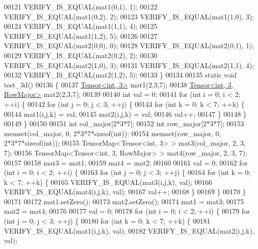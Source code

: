 \begin{DoxyCode}
00121   VERIFY\_IS\_EQUAL(mat1(0,1), 1);
00122   VERIFY\_IS\_EQUAL(mat1(0,2), 2);
00123   VERIFY\_IS\_EQUAL(mat1(1,0), 3);
00124   VERIFY\_IS\_EQUAL(mat1(1,1), 4);
00125   VERIFY\_IS\_EQUAL(mat1(1,2), 5);
00126 
00127   VERIFY\_IS\_EQUAL(mat2(0,0), 0);
00128   VERIFY\_IS\_EQUAL(mat2(0,1), 1);
00129   VERIFY\_IS\_EQUAL(mat2(0,2), 2);
00130   VERIFY\_IS\_EQUAL(mat2(1,0), 3);
00131   VERIFY\_IS\_EQUAL(mat2(1,1), 4);
00132   VERIFY\_IS\_EQUAL(mat2(1,2), 5);
00133 \}
00134 
00135 \textcolor{keyword}{static} \textcolor{keywordtype}{void} test\_3d()
00136 \{
00137   \hyperlink{class_eigen_1_1_tensor}{Tensor<int, 3>} mat1(2,3,7);
00138   \hyperlink{class_eigen_1_1_tensor}{Tensor<int, 3, RowMajor>} mat2(2,3,7);
00139 
00140   \textcolor{keywordtype}{int} val = 0;
00141   \textcolor{keywordflow}{for} (\textcolor{keywordtype}{int} i = 0; i < 2; ++i) \{
00142     \textcolor{keywordflow}{for} (\textcolor{keywordtype}{int} j = 0; j < 3; ++j) \{
00143       \textcolor{keywordflow}{for} (\textcolor{keywordtype}{int} k = 0; k < 7; ++k) \{
00144         mat1(i,j,k) = val;
00145         mat2(i,j,k) = val;
00146         val++;
00147       \}
00148     \}
00149   \}
00150 
00151   \textcolor{keywordtype}{int} col\_major[2*3*7];
00152   \textcolor{keywordtype}{int} row\_major[2*3*7];
00153   memset(col\_major, 0, 2*3*7*\textcolor{keyword}{sizeof}(\textcolor{keywordtype}{int}));
00154   memset(row\_major, 0, 2*3*7*\textcolor{keyword}{sizeof}(\textcolor{keywordtype}{int}));
00155   TensorMap<Tensor<int, 3> > mat3(col\_major, 2, 3, 7);
00156   TensorMap<Tensor<int, 3, RowMajor> > mat4(row\_major, 2, 3, 7);
00157 
00158   mat3 = mat1;
00159   mat4 = mat2;
00160 
00161   val = 0;
00162   \textcolor{keywordflow}{for} (\textcolor{keywordtype}{int} i = 0; i < 2; ++i) \{
00163     \textcolor{keywordflow}{for} (\textcolor{keywordtype}{int} j = 0; j < 3; ++j) \{
00164       \textcolor{keywordflow}{for} (\textcolor{keywordtype}{int} k = 0; k < 7; ++k) \{
00165         VERIFY\_IS\_EQUAL(mat3(i,j,k), val);
00166         VERIFY\_IS\_EQUAL(mat4(i,j,k), val);
00167         val++;
00168       \}
00169     \}
00170   \}
00171 
00172   mat1.setZero();
00173   mat2.setZero();
00174   mat1 = mat3;
00175   mat2 = mat4;
00176 
00177   val = 0;
00178   \textcolor{keywordflow}{for} (\textcolor{keywordtype}{int} i = 0; i < 2; ++i) \{
00179     \textcolor{keywordflow}{for} (\textcolor{keywordtype}{int} j = 0; j < 3; ++j) \{
00180       \textcolor{keywordflow}{for} (\textcolor{keywordtype}{int} k = 0; k < 7; ++k) \{
00181         VERIFY\_IS\_EQUAL(mat1(i,j,k), val);
00182         VERIFY\_IS\_EQUAL(mat2(i,j,k), val);

\end{DoxyCode}
